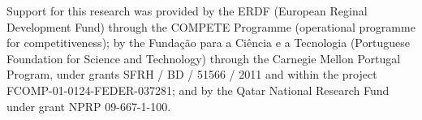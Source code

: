 Support for this research was provided by the ERDF (European Reginal Development Fund) through the COMPETE Programme (operational programme for competitiveness); by the Funda\c{c}\~{a}o para a Ci\^{e}ncia e a Tecnologia (Portuguese Foundation for Science and Technology) through the Carnegie Mellon Portugal Program, under grants SFRH / BD / 51566 / 2011 and within the project FCOMP-01-0124-FEDER-037281; and by the Qatar National Research Fund under grant NPRP 09-667-1-100.
